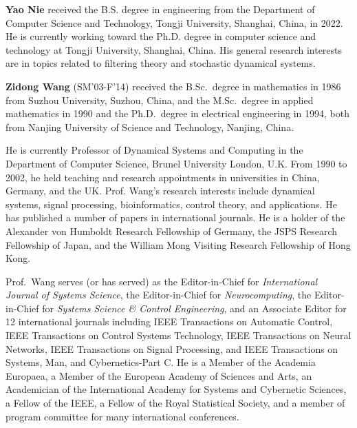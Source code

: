 \documentclass[10pt,twocolumn,twoside]{IEEEtran}
\begin{document}
\begin{IEEEbiography}
{\bf Yao Nie} received the B.S. degree in engineering from the Department of Computer Science and Technology, Tongji University, Shanghai, China, in 2022. He is currently working toward the Ph.D. degree in computer science and technology at Tongji University, Shanghai, China. His general research interests are in topics related to filtering theory and stochastic dynamical systems.
\end{IEEEbiography}

\begin{IEEEbiography}
{\bf Zidong Wang} (SM'03-F'14) received the B.Sc.~degree in mathematics in 1986 from Suzhou University, Suzhou, China, and the M.Sc.~degree in applied mathematics in 1990 and the Ph.D.~degree in electrical engineering in 1994, both from Nanjing University of Science and Technology, Nanjing, China.

He is currently Professor of Dynamical Systems and Computing in the Department of Computer Science, Brunel University London, U.K. From 1990 to 2002, he held teaching and research appointments in universities in China, Germany, and the UK. Prof. Wang's research interests include dynamical systems, signal processing, bioinformatics, control theory, and applications. He has published a number of papers in international journals. He is a holder of the Alexander von Humboldt Research Fellowship of Germany, the JSPS Research Fellowship of Japan, and the William Mong Visiting Research Fellowship of Hong Kong.

Prof.~Wang serves (or has served) as the Editor-in-Chief for {\it International Journal of Systems Science}, the Editor-in-Chief for {\it Neurocomputing}, the Editor-in-Chief for {\it Systems Science \& Control Engineering}, and an Associate Editor for 12 international journals including IEEE Transactions on Automatic Control, IEEE Transactions on Control Systems Technology, IEEE Transactions on Neural Networks, IEEE Transactions on Signal Processing, and IEEE Transactions on Systems, Man, and Cybernetics-Part C. He is a Member of the Academia Europaea, a Member of the European Academy of Sciences and Arts, an Academician of the International Academy for Systems and Cybernetic Sciences, a Fellow of the IEEE, a Fellow of the Royal Statistical Society, and a member of program committee for many international conferences.
\end{IEEEbiography}
\end{document}
